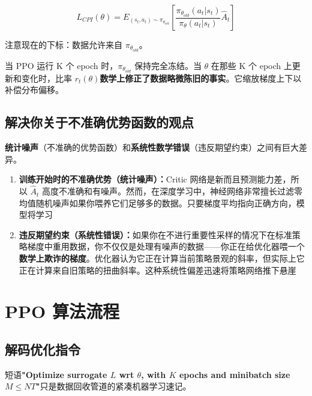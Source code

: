 \documentclass[12pt,a4paper]{article}
\theoremstyle{noteplain}
\theoremstyle{noteexercise}
\begin{document}
\begin{equation}\label{eq:l-cpi-is}
  L_{CPI}(\theta) = E_{(s_t, a_t) \sim \pi_{\theta_{old}}}\left[\frac{\pi_{\theta_{old}}(a_t|s_t)}{\pi_\theta(a_t|s_t)} \hat{A}_t\right]
\end{equation}

注意现在的下标：数据允许来自 $\pi_{\theta_{old}}$。

当 PPO 运行 K 个 epoch 时，$\pi_{\theta_{old}}$ 保持完全冻结。当 $\theta$ 在那些 K 个 epoch 上更新和变化时，比率 $r_t(\theta)$\textbf{数学上修正了数据略微陈旧的事实}。它缩放梯度上下以补偿分布偏移。

\subsection{解决你关于不准确优势函数的观点}

\textbf{统计噪声}（不准确的优势函数）和\textbf{系统性数学错误}（违反期望约束）之间有巨大差异。

\begin{enumerate}
  \setlength{\itemsep}{0.2em}
  \item \textbf{训练开始时的不准确优势（统计噪声）：}Critic 网络是新而且预测能力差，所以 $\hat{A}_t$ 高度不准确和有噪声。然而，在深度学习中，神经网络非常擅长过滤零均值随机噪声如果你喂养它们足够多的数据。只要梯度平均指向正确方向，模型将学习
  \item \textbf{违反期望约束（系统性错误）：}如果你在不进行重要性采样的情况下在标准策略梯度中重用数据，你不仅仅是处理有噪声的数据——你正在给优化器喂一个\textbf{数学上欺诈的梯度}。优化器认为它正在计算当前策略景观的斜率，但实际上它正在计算来自旧策略的扭曲斜率。这种系统性偏差迅速将策略网络推下悬崖
\end{enumerate}

\section{PPO 算法流程}\label{sec:procedure}

\subsection{解码优化指令}

短语\textbf{"Optimize surrogate $L$ wrt $\theta$, with $K$ epochs and minibatch size $M \leq NT$"}只是数据回收管道的紧凑机器学习速记。
\end{document}
